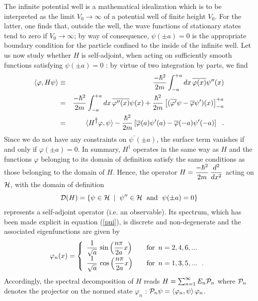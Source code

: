 \documentclass[a4wide,12pt]{report}
\begin{document}
The infinite potential well is a mathematical idealization 
which is to be interpreted as the limit $V_0 \rightarrow \infty$
of a potential well of finite height $V_0$. For the latter, 
one finds that, outside the well, the wave functions 
of stationary states tend to zero if 
$V_0 \rightarrow \infty$; by way of consequence, $\psi(\pm a)=0$
is the appropriate boundary condition for the particle 
confined to the inside of 
the infinite well. Let us now study whether $H$ is self-adjoint,
when acting on sufficiently smooth  functions 
satisfying $\psi (\pm a)=0$ : by virtue of two integration 
by parts, we find  
\begin{eqnarray*}
\langle \varphi , H \psi \rangle & \equiv &
\displaystyle{- \hbar^2 \over 2m} \int_{-a}^{+a} dx \, \overline{\varphi(x)}
\psi^{\prime \prime}(x)
\\
&= &
\displaystyle{- \hbar^2 \over 2m} \int_{-a}^{+a} dx \, \overline{\varphi^{\prime
\prime}(x)}
\psi (x) +
\displaystyle{\hbar^2 \over 2m}
\left[ (\overline{\varphi^{\prime}} \psi - \overline{\varphi}
\psi^{\prime} )(x) \right]_{-a}^{+a}
\\
& = & \langle H^{\displaystyle{\dagger}} \varphi , \psi \rangle -
\displaystyle{\hbar^2 \over 2m}
\left[ \overline{\varphi} (a)\psi^{\prime} (a) - \overline{\varphi}(-a)
\psi^{\prime} (-a) \right]
\ \ .
\end{eqnarray*}
Since we do not have any constraints on $\psi^{\prime}(\pm a)$,
the surface term vanishes if and only if $\varphi (\pm a)=0$.
In summary, $H^{\dag}$ operates in the same way as $H$
and the functions $\varphi$ belonging to its domain of definition 
satisfy the same conditions as those belonging to the domain of $H$. 
Hence, the operator 
$H= \displaystyle{-\hbar^2 \over 2m} \, \displaystyle{d^2 \over dx^2}$ acting on 
${\cal H}$, with the domain of definition 
\begin{equation}
{\cal D} (H) = \{ \psi \in {\cal H} \; \mid \; \psi^{\prime \prime}
\in {\cal H} \ \; {\rm and} \ \; \psi(\pm a) =0 \}
\end{equation}
represents a self-adjoint operator (i.e. an observable). 
Its spectrum, which has been made explicit in equation (\ref{pui}),
is discrete and non-degenerate and the associated eigenfunctions 
are given by 
\[
\varphi_n (x) = \left\{
\begin{array}{ll}
\displaystyle{1 \over \sqrt a} \  {\rm sin}  \left( \displaystyle{n\pi \over 2a} x \right)
& \quad {\rm for} \ \, n=2,4,6,...
\\
\displaystyle{1 \over \sqrt a} \  {\rm cos}  \left( \displaystyle{n\pi \over 2a} x \right)
& \quad {\rm for} \ \, n=1,3,5,... \ \ .
\end{array}
\right.
\]
Accordingly, the spectral decomposition of $H$ reads
$H= \sum_{n=1}^{\infty} E_n {\cal P}_n$ where ${\cal P}_n$
 denotes the projector on the normed state $\varphi_n$ :
${\cal P}_n \psi = \langle \varphi_n , \psi \rangle \, \varphi_n$.
 
\end{document}
